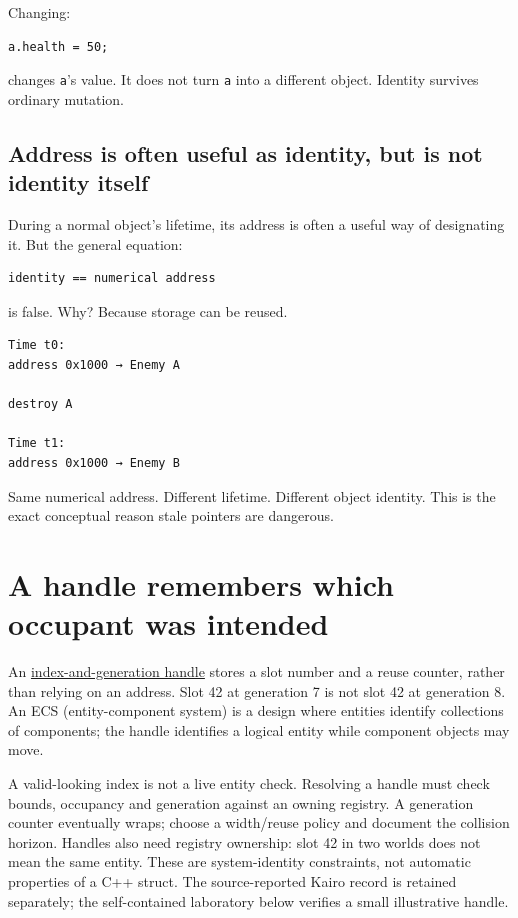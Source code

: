 Changing:

\begin{verbatim}
a.health = 50;
\end{verbatim}

changes \texttt{a}'s value. It does not turn \texttt{a} into a different object. Identity survives ordinary mutation.

\subsection{Address is often useful as identity, but is not identity itself}\label{01-foundations-i-ch002-address-is-often-useful-as-identity-but-is-not-identity-itself}

During a normal object's lifetime, its address is often a useful way of designating it. But the general equation:

\begin{verbatim}
identity == numerical address
\end{verbatim}

is false. Why? Because storage can be reused.

\begin{verbatim}
Time t0:
address 0x1000 → Enemy A

destroy A

Time t1:
address 0x1000 → Enemy B
\end{verbatim}

Same numerical address. Different lifetime. Different object identity. This is the exact conceptual reason stale pointers are dangerous.

\section{A handle remembers which occupant was intended}\label{01-foundations-i-ch002-a-handle-remembers-which-occupant-was-intended}

An \hyperref[appendix-f1581457d322]{index-and-generation handle} stores a slot number and a reuse counter, rather than relying on an address. Slot 42 at generation 7 is not slot 42 at generation 8. An ECS (entity-component system) is a design where entities identify collections of components; the handle identifies a logical entity while component objects may move.

A valid-looking index is not a live entity check. Resolving a handle must check bounds, occupancy and generation against an owning registry. A generation counter eventually wraps; choose a width/reuse policy and document the collision horizon. Handles also need registry ownership: slot 42 in two worlds does not mean the same entity. These are system-identity constraints, not automatic properties of a C++ struct. The source-reported Kairo record is retained separately; the self-contained laboratory below verifies a small illustrative handle.

